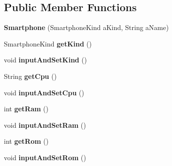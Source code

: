 \subsection*{Public Member Functions}
\begin{DoxyCompactItemize}
\item 
\mbox{\label{classswimmypractice5_1_1_smartphone_aa653b938902784088470a3f0703feefe}} 
{\bfseries Smartphone} (Smartphone\+Kind a\+Kind, String a\+Name)
\item 
\mbox{\label{classswimmypractice5_1_1_smartphone_a16bffc9a4a730adc571a4ddfdb9e9e4c}} 
Smartphone\+Kind {\bfseries get\+Kind} ()
\item 
\mbox{\label{classswimmypractice5_1_1_smartphone_af1d4cedfc2937ec4c8c81d858a917ef7}} 
void {\bfseries input\+And\+Set\+Kind} ()
\item 
\mbox{\label{classswimmypractice5_1_1_smartphone_a58f2805dc48669aba850c6aa50c0b6b2}} 
String {\bfseries get\+Cpu} ()
\item 
\mbox{\label{classswimmypractice5_1_1_smartphone_a1f561d11d3d7d10c436677b88dfe30d7}} 
void {\bfseries input\+And\+Set\+Cpu} ()
\item 
\mbox{\label{classswimmypractice5_1_1_smartphone_a6d942717cede6f41daaca02d557dcfb3}} 
int {\bfseries get\+Ram} ()
\item 
\mbox{\label{classswimmypractice5_1_1_smartphone_a1b89c55326ba55ab332ae3e3a63492f4}} 
void {\bfseries input\+And\+Set\+Ram} ()
\item 
\mbox{\label{classswimmypractice5_1_1_smartphone_a5f8a1a80936ab416a072bd0edae4ef8d}} 
int {\bfseries get\+Rom} ()
\item 
\mbox{\label{classswimmypractice5_1_1_smartphone_a66b2e5acbda4f97a49dbe32a299bc188}} 
void {\bfseries input\+And\+Set\+Rom} ()
\item 

\end{DoxyCompactItemize}
